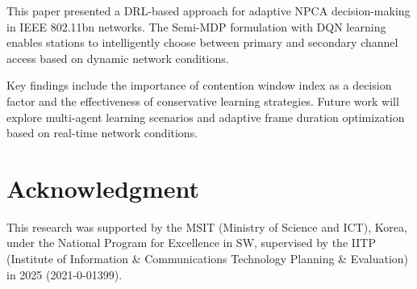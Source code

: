 \documentclass[conference]{IEEEtran}
\begin{document}
This paper presented a DRL-based approach for adaptive NPCA decision-making in IEEE 802.11bn networks. The Semi-MDP formulation with DQN learning enables stations to intelligently choose between primary and secondary channel access based on dynamic network conditions.

Key findings include the importance of contention window index as a decision factor and the effectiveness of conservative learning strategies. Future work will explore multi-agent learning scenarios and adaptive frame duration optimization based on real-time network conditions.







\section*{Acknowledgment}

This research was supported by the MSIT (Ministry of Science and ICT), Korea, under the National Program for Excellence in SW, supervised by the IITP (Institute of Information \& Communications Technology Planning \& Evaluation) in 2025 (2021-0-01399).




\end{document}

